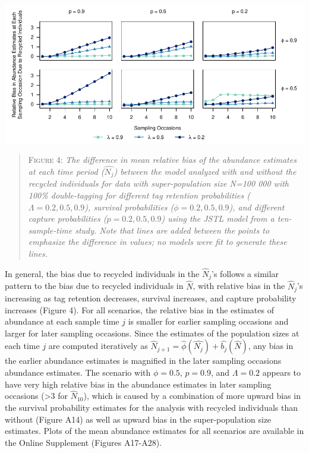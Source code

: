 \documentclass[]{article}
\begin{document}
\includegraphics{RecycledPaper_files/figure-latex/Figure4_N_j-1.pdf}

\begin{quote}
\textsc{Figure 4:}
\textsl{The difference in mean relative bias of the abundance estimates at each time period ($\hat{N_j}$) between the model analyzed with and without the recycled individuals for data with super-population size N=100 000 with 100\% double-tagging for different tag retention probabilities ($\Lambda=0.2,0.5,0.9$), survival probabilities ($\phi=0.2,0.5,0.9$), and different capture probabilities ($p=0.2,0.5,0.9$) using the JSTL model from a ten-sample-time study.  Note that lines are added between the points to emphasize the difference in values; no models were fit to generate these lines.}
\end{quote}

In general, the bias due to recycled individuals in the \(\hat{N}_j\)'s
follows a similar pattern to the bias due to recycled individuals in
\(\hat{N}\), with relative bias in the \(\hat{N}_j\)'s increasing as tag
retention decreases, survival increases, and capture probability
increases (Figure 4). For all scenarios, the relative bias in the
estimates of abundance at each sample time \(j\) is smaller for earlier
sampling occasions and larger for later sampling occasions. Since the
estimates of the population sizes at each time \(j\) are computed
iteratively as
\(\hat{N}_{j+1}=\hat{\phi}(\hat{N_j})+\hat{b_j}(\hat{N})\), any bias in
the earlier abundance estimates is magnified in the later sampling
occasions abundance estimates. The scenario with \(\phi=0.5\),
\(p=0.9\), and \(\Lambda=0.2\) appears to have very high relative bias
in the abundance estimates in later sampling occasions (\textgreater{}3
for \(\hat{N}_{10}\)), which is caused by a combination of more upward
bias in the survival probability estimates for the analysis with recycled
individuals than without (Figure A14) as well as upward bias in the
super-population size estimates. Plots of the mean abundance estimates
for all scenarios are available in the Online Supplement (Figures A17-A28).
\end{document}
